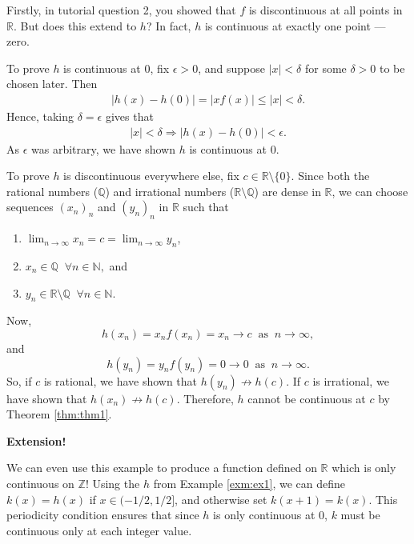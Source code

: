 \documentclass[
  10pt,
  a4paper]{article}
\providecommand{\tightlist}{%
  \setlength{\itemsep}{0pt}\setlength{\parskip}{0pt}}
\theoremstyle{plain}
\theoremstyle{definition}
\theoremstyle{plain}
\theoremstyle{plain}
\theoremstyle{plain}
\theoremstyle{plain}
\theoremstyle{definition}
\theoremstyle{definition}
\theoremstyle{remark}
\theoremstyle{remark}
\let\BeginKnitrBlock\begin \let\EndKnitrBlock\end
\begin{document}
\BeginKnitrBlock{solution*}
Firstly, in tutorial question 2, you showed that \(f\) is discontinuous at all points in \(\mathbb{R}\). But does this extend to \(h\)? In fact, \(h\) is continuous at exactly one point --- zero.

To prove \(h\) is continuous at \(0\), fix \(\epsilon > 0\), and suppose \(\lvert x \rvert < \delta\) for some \(\delta > 0\) to be chosen later. Then
\begin{align*}
\lvert h(x) - h(0) \rvert = \lvert x f(x) \rvert \leq \lvert x \rvert < \delta.
\end{align*}
Hence, taking \(\delta = \epsilon\) gives that
\begin{align*}
\lvert x \rvert < \delta \Longrightarrow \lvert h(x) - h(0) \rvert < \epsilon.
\end{align*}
As \(\epsilon\) was arbitrary, we have shown \(h\) is continuous at \(0\).

To prove \(h\) is discontinuous everywhere else, fix \(c \in \mathbb{R}\setminus \lbrace 0 \rbrace.\) Since both the rational numbers (\(\mathbb{Q}\)) and irrational numbers (\(\mathbb{R}\setminus\mathbb{Q}\)) are dense in \(\mathbb{R}\), we can choose sequences \((x_n)_n\) and \((y_n)_n\) in \(\mathbb{R}\) such that

\begin{enumerate}
\def\labelenumi{\arabic{enumi}.}
\tightlist
\item
  \(\lim_{n \to \infty} x_n = c = \lim_{n \to \infty} y_n\),
\item
  \(x_n \in \mathbb{Q}\;\;\forall n \in \mathbb{N},\) and
\item
  \(y_n \in \mathbb{R}\setminus\mathbb{Q}\;\;\forall n \in \mathbb{N}.\)
\end{enumerate}

Now, \[h(x_n) = x_n f(x_n) = x_n \to c \;\;\text{as}\;\; n \to \infty,\] and \[h(y_n) = y_n f(y_n) = 0 \to 0 \;\;\text{as}\;\; n \to \infty.\] So, if \(c\) is rational, we have shown that \(h(y_n)\not\to h(c)\). If \(c\) is irrational, we have shown that \(h(x_n)\not\to h(c)\). Therefore, \(h\) cannot be continuous at \(c\) by Theorem \ref{thm:thm1}.
\EndKnitrBlock{solution*}

\textbf{Extension!}

\BeginKnitrBlock{example}
{\label{exm:ex2} }We can even use this example to produce a function defined on \(\mathbb{R}\) which is only continuous on \(\mathbb{Z}\)! Using the \(h\) from Example \ref{exm:ex1}, we can define \(k(x) = h(x)\) if \(x \in (-1/2, 1/2]\), and otherwise set \(k(x + 1) = k(x).\) This periodicity condition ensures that since \(h\) is only continuous at \(0\), \(k\) must be continuous only at each integer value.
\EndKnitrBlock{example}
\end{document}
